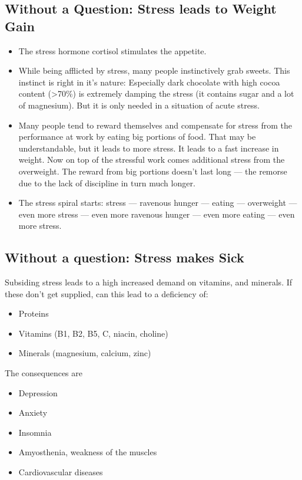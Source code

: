 \documentclass[../main.tex]{subfiles}
\begin{document}
\subsection{Without a Question: Stress leads to Weight Gain}

\begin{itemize}
\item The stress hormone cortisol stimulates the appetite.
\item While being afflicted by stress, many people instinctively grab sweets.
  This instinct is right in it's nature: Especially dark chocolate with high cocoa content (\textgreater 70\%) is extremely damping the stress
  (it contains sugar and a lot of magnesium).
  But it is only needed in a situation of acute stress.
\item Many people tend to reward themselves and compensate for stress from the performance at work by eating big portions of food.
  That may be understandable, but it leads to more stress.
  It leads to a fast increase in weight.
  Now on top of the stressful work comes additional stress from the overweight.
  The reward from big portions doesn't last long --- the remorse due to the lack of discipline in turn much longer.
\item The stress spiral starts: stress --- ravenous hunger --- eating --- overweight --- even more stress --- even more ravenous hunger ---
  even more eating --- even more stress.
\end{itemize}

\subsection{Without a question: Stress makes Sick}

Subsiding stress leads to a high increased demand on vitamins, and minerals.
If these don't get supplied, can this lead to a deficiency of:

\begin{itemize}
\item Proteins
\item Vitamins (B1, B2, B5, C, niacin, choline)
\item Minerals  (magnesium, calcium, zinc)
\end{itemize}

\noindent The consequences are

\begin{itemize}
\item Depression
\item Anxiety
\item Insomnia
\item Amyosthenia, weakness of the muscles
\item Cardiovascular diseases
\end{itemize}
\end{document}
